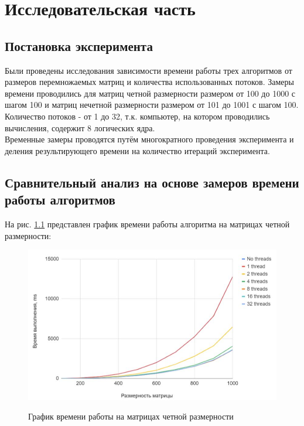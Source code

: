 \documentclass[12pt]{report}
\begin{document}
\chapter{Исследовательская часть}

\section{Постановка эксперимента}

Были проведены исследования зависимости времени работы трех алгоритмов от размеров перемножаемых матриц и количества использованных потоков. Замеры времени проводились для матриц четной размерности размером от 100 до 1000 с шагом 100 и матриц нечетной размерности размером от 101 до 1001 с шагом 100. Количество потоков - от 1 до 32, т.к. компьютер, на котором проводились вычисления, содержит 8 логических ядра.\\
	
	 Временные замеры проводятся путём многократного проведения эксперимента и деления результирующего времени на количество итераций эксперимента. \\

\section{Сравнительный анализ на основе замеров времени работы алгоритмов}

На рис. \ref{chet} представлен график времени работы алгоритма на матрицах четной размерности:
	
	\begin{figure}[h]
        	\begin{center}
        		{\includegraphics[scale = 0.8]{diag_chet2}}
        		\caption{График времени работы на матрицах четной размерности}
        		\label{chet}
        	\end{center}
        \end{figure}
\end{document}
